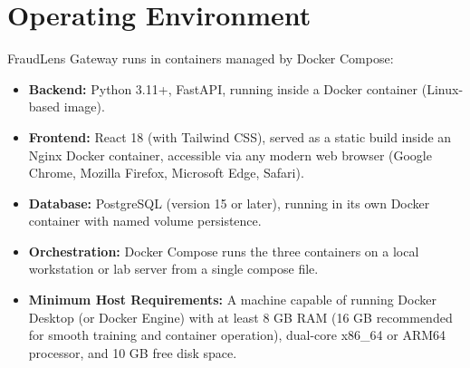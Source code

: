 \documentclass[12pt, a4paper]{report}
\begin{document}
\section{Operating Environment}
FraudLens Gateway runs in containers managed by Docker Compose:
\begin{itemize}
    \item \textbf{Backend:} Python 3.11+, FastAPI, running inside a Docker container (Linux-based image).
    \item \textbf{Frontend:} React 18 (with Tailwind CSS), served as a static build inside an Nginx Docker container, accessible via any modern web browser (Google Chrome, Mozilla Firefox, Microsoft Edge, Safari).
    \item \textbf{Database:} PostgreSQL (version 15 or later), running in its own Docker container with named volume persistence.
    \item \textbf{Orchestration:} Docker Compose runs the three containers on a local workstation or lab server from a single compose file.
    \item \textbf{Minimum Host Requirements:} A machine capable of running Docker Desktop (or Docker Engine) with at least 8 GB RAM (16 GB recommended for smooth training and container operation), dual-core x86\_64 or ARM64 processor, and 10 GB free disk space.
\end{itemize}
\end{document}
